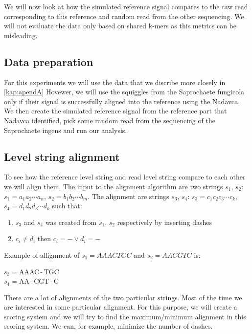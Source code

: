 We will now look at how the simulated reference signal compares to the raw read
corresponding to this reference and random read from the other sequencing. We will
not evaluate the data only based on shared k-mers as this metrics can be misleading.

\subsection{Data preparation}

For this experiments we will use the data that we discribe more closely in \ref{kap:apendA}
Hovewer, we will use the squiggles from the Saprochaete fungicola only if their signal
is successfully aligned into the reference using the Nadavca. We then create the
simulated reference signal from the reference part that Nadavca identified, pick
some random read from the sequencing of the Saprochaete ingens and run our analysis.

\subsection{Level string alignment}

To see how the reference level string and read level string compare to each other
we will align them. The input to the alignment algorithm are two strings $s_1$, $s_2$:
$s_1=a_1a_2\cdots a_n$, $s_2=b_1b_2\cdots b_m$. The alignment are strings
$s_3$, $s_4$: $s_3 = c_1c_2c_3\cdots c_k$, $s_4 = d_1d_2d_3\cdots d_k$
such that:

\begin{enumerate}
\item $s_3$ and $s_4$ was created from $s_1$, $s_2$ respectively by inserting dashes
\item $c_i \neq d_i$ then $c_i = - \lor d_i = -$
\end{enumerate}

Example of allignment of $s_1 = AAACTGC$ and $s_2 = AACGTC$ is:

\begin{center}
$s_3 = $AAAC\,-\,TGC\\
$s_4 = $AA\,-\,CGT\,-\,C
\end{center}

There are a lot of alignments of the two particular strings. Most of the time we
are interested in some particular alignment. For this purpose, we will create a
scoring system and we will try to find the maximum/minimum alignment in this scoring
system. We can, for example, minimize the number of dashes.

